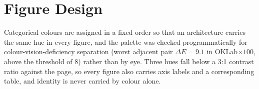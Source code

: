 \section{Figure Design}
\label{app:figures}

Categorical colours are assigned in a fixed order so that an architecture
carries the same hue in every figure, and the palette was checked
programmatically for colour-vision-deficiency separation (worst adjacent pair
$\Delta E = 9.1$ in OKLab$\times100$, above the threshold of 8) rather than by
eye. Three hues fall below a 3:1 contrast ratio against the page, so every
figure also carries axis labels and a corresponding table, and identity is never
carried by colour alone.
